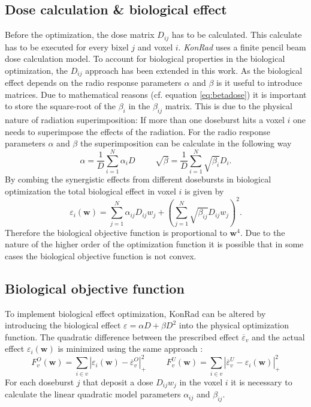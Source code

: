 \subsection{Dose calculation \& biological effect}
Before the optimization, the dose matrix $D_{ij}$ has to be calculated. This calculate has to be executed for every bixel $j$ and voxel $i$. \textit{KonRad} uses a finite pencil beam dose calculation model\cite{nill}. To account for biological properties in the biological optimization, the $D_{ij}$ approach has been extended in this work. As the biological effect depends on the radio response parameters $\alpha$ and $\beta$ is it useful to introduce matrices. Due to mathematical reasons (cf. equation \ref{eq:betadose}) it is important to store the square-root of the $\beta_i$ in the $\beta_{ij}$ matrix. This is due to the physical nature of radiation superimposition: If more than one doseburst hits a voxel $i$ one needs to superimpose the effects of the radiation. For the radio response parameters $\alpha$ and $\beta$ the superimposition can be calculate in the following way \cite{pmid7413933} \cite{pmid16757867}
\begin{equation}\label{eq:betadose}
\alpha = \frac{1}{D}\sum\limits_{i=1}^N\alpha_i D\hspace{1cm}\sqrt{\beta} = \frac{1}{D}\sum\limits_{i=1}^N\sqrt{\beta_i}D_i.
\end{equation}
By combing the synergistic effects from different dosebursts in biological optimization the total biological effect in voxel $i$ is given by \cite{pmid16757867}
\begin{equation}
\varepsilon_i(\mathbf{w}) = \sum\limits_{j=1}^N\alpha_{ij}D_{ij}w_j+\left(\sum\limits_{j=1}^N\sqrt{\beta_{ij}}D_{ij}w_j\right)^2.
\end{equation}
Therefore the biological objective function is proportional to $\mathbf{w}^4$. Due to the nature of the higher order of the optimization function it is possible that in some cases the biological objective function is not convex\cite{FreseThesis}.
\subsection{Biological objective function}
To implement biological effect optimization, KonRad can be altered by introducing the biological effect $\varepsilon = \alpha D + \beta D^2$ into the physical optimization function. The quadratic difference between the prescribed effect $\overline{\varepsilon}_v$ and the actual effect $\varepsilon_i(\mathbf{w})$ is minimized using the same approach \cite{FreseThesis}:
\begin{equation}
F_v^O (\mathbf{w}) = \sum\limits_{i\in v} \left|\varepsilon_i(\mathbf{w})-\overline{\varepsilon}_v^O\right|_+^2\hspace{1cm}F_v^U (\mathbf{w}) = \sum\limits_{i\in v} \left|\overline{\varepsilon}_v^U-\varepsilon_i(\mathbf{w})\right|_+^2
\end{equation}
For each doseburst $j$ that deposit a dose $D_{ij}w_j$ in the voxel $i$ it is necessary to calculate the linear quadratic model parameters $\alpha_{ij}$ and $\beta_{ij}$.
